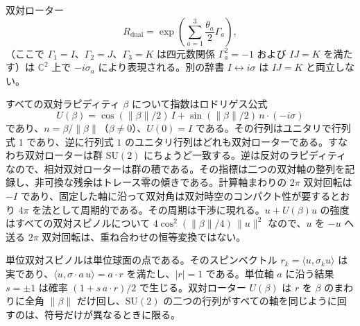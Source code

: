 \documentclass[a4paper]{article}
\begin{document}
双対ローター
\[
R_\text{dual} = \exp\left( \sum_{a=1}^3 \frac{\theta_a}{2} \Gamma_a \right),
\]
（ここで $\Gamma_1 = I$、$\Gamma_2 = J$、$\Gamma_3 = K$ は四元数関係 $\Gamma_a^2 = -1$ および $IJ=K$ を満たす）は $\mathbb{C}^2$ 上で $-i\sigma_a$ により表現される。別の辞書 $I\leftrightarrow i\sigma$ は $IJ=K$ と両立しない。

すべての双対ラピディティ $\beta$ について指数はロドリゲス公式
\[
U(\beta)
=\cos(\lVert\beta\rVert/2)\,I
+\sin(\lVert\beta\rVert/2)\,n\cdot(-i\sigma)
\]
であり、$n=\beta/\lVert\beta\rVert$（$\beta\neq 0$）、$U(0)=I$ である。その行列はユニタリで行列式 $1$ であり、逆に行列式 $1$ のユニタリ行列はどれも双対ローターである。すなわち双対ローターは群 $\mathrm{SU}(2)$ にちょうど一致する。逆は反対のラピディティなので、相対双対ローターは群の積である。その指標は二つの双対軸の整列を記録し、非可換な残余はトレース零の傾きである。計算軸まわりの $2\pi$ 双対回転は $-I$ であり、固定した軸に沿って双対角は双対時空のコンパクト性が要するとおり $4\pi$ を法として周期的である。その周期は干渉に現れる。$u+U(\beta)u$ の強度はすべての双対スピノルについて $4\cos^2(\lVert\beta\rVert/4)\,\lVert u\rVert^2$ なので、$u$ を $-u$ へ送る $2\pi$ 双対回転は、重ね合わせの恒等変換ではない。

単位双対スピノルは単位球面の点である。そのスピンベクトル $r_k=\langle u,\sigma_k u\rangle$ は実であり、$\langle u,\sigma\cdot a\,u\rangle=a\cdot r$ を満たし、$|r|=1$ である。単位軸 $a$ に沿う結果 $s=\pm1$ は確率 $(1+s\,a\cdot r)/2$ で生じる。双対ローター $U(\beta)$ は $r$ を $\beta$ のまわりに全角 $\lVert\beta\rVert$ だけ回し、$\mathrm{SU}(2)$ の二つの行列がすべての軸を同じように回すのは、符号だけが異なるときに限る。
\end{document}
